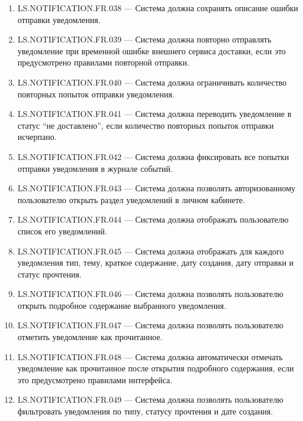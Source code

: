 \documentclass[12pt,a4paper]{article}
\begin{document}
\begin{enumerate}
		\item LS.NOTIFICATION.FR.038 --- Система должна сохранять описание ошибки отправки
		уведомления.
		
		\item LS.NOTIFICATION.FR.039 --- Система должна повторно отправлять уведомление
		при временной ошибке внешнего сервиса доставки, если это предусмотрено правилами
		повторной отправки.
		
		\item LS.NOTIFICATION.FR.040 --- Система должна ограничивать количество повторных
		попыток отправки уведомления.
		
		\item LS.NOTIFICATION.FR.041 --- Система должна переводить уведомление в статус
		``не доставлено'', если количество повторных попыток отправки исчерпано.
		
		\item LS.NOTIFICATION.FR.042 --- Система должна фиксировать все попытки отправки
		уведомления в журнале событий.
		
		\item LS.NOTIFICATION.FR.043 --- Система должна позволять авторизованному пользователю
		открыть раздел уведомлений в личном кабинете.
		
		\item LS.NOTIFICATION.FR.044 --- Система должна отображать пользователю список
		его уведомлений.
		
		\item LS.NOTIFICATION.FR.045 --- Система должна отображать для каждого уведомления
		тип, тему, краткое содержание, дату создания, дату отправки и статус прочтения.
		
		\item LS.NOTIFICATION.FR.046 --- Система должна позволять пользователю открыть
		подробное содержание выбранного уведомления.
		
		\item LS.NOTIFICATION.FR.047 --- Система должна позволять пользователю отметить
		уведомление как прочитанное.
		
		\item LS.NOTIFICATION.FR.048 --- Система должна автоматически отмечать уведомление
		как прочитанное после открытия подробного содержания, если это предусмотрено
		правилами интерфейса.
		
		\item LS.NOTIFICATION.FR.049 --- Система должна позволять пользователю фильтровать
		уведомления по типу, статусу прочтения и дате создания.
		

\end{enumerate}
\end{document}
